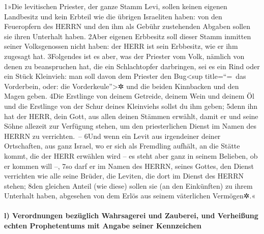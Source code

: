 1»Die levitischen Priester, der ganze Stamm Levi, sollen keinen eigenen
Landbesitz und kein Erbteil wie die übrigen Israeliten haben: von den
Feueropfern des HERRN und den ihm als Gebühr zustehenden Abgaben sollen
sie ihren Unterhalt haben. 2Aber eigenen Erbbesitz soll dieser Stamm
inmitten seiner Volksgenossen nicht haben: der HERR ist sein Erbbesitz,
wie er ihm zugesagt hat. 3Folgendes ist es aber, was der Priester vom
Volk, nämlich von denen zu beanspruchen hat, die ein Schlachtopfer
darbringen, sei es ein Rind oder ein Stück Kleinvieh: man soll davon dem
Priester den Bug\textless sup title=``=~das Vorderbein, oder: die
Vorderkeule''\textgreater✲ und die beiden Kinnbacken und den Magen
geben. 4Die Erstlinge von deinem Getreide, deinem Wein und deinem Öl und
die Erstlinge von der Schur deines Kleinviehs sollst du ihm geben; 5denn
ihn hat der HERR, dein Gott, aus allen deinen Stämmen erwählt, damit er
und seine Söhne allezeit zur Verfügung stehen, um den priesterlichen
Dienst im Namen des HERRN zu verrichten.~-- 6Und wenn ein Levit aus
irgendeiner deiner Ortschaften, aus ganz Israel, wo er sich als
Fremdling aufhält, an die Stätte kommt, die der HERR erwählen wird -- es
steht aber ganz in seinem Belieben, ob er kommen will --, 7so darf er im
Namen des HERRN, seines Gottes, den Dienst verrichten wie alle seine
Brüder, die Leviten, die dort im Dienst des HERRN stehen; 8den gleichen
Anteil (wie diese) sollen sie (an den Einkünften) zu ihrem Unterhalt
haben, abgesehen von dem Erlös aus seinem väterlichen Vermögen✲.«

\hypertarget{l-verordnungen-bezuxfcglich-wahrsagerei-und-zauberei-und-verheiuxdfung-echten-prophetentums-mit-angabe-seiner-kennzeichen}{%
\paragraph{l) Verordnungen bezüglich Wahrsagerei und Zauberei, und
Verheißung echten Prophetentums mit Angabe seiner
Kennzeichen}\label{l-verordnungen-bezuxfcglich-wahrsagerei-und-zauberei-und-verheiuxdfung-echten-prophetentums-mit-angabe-seiner-kennzeichen}}


